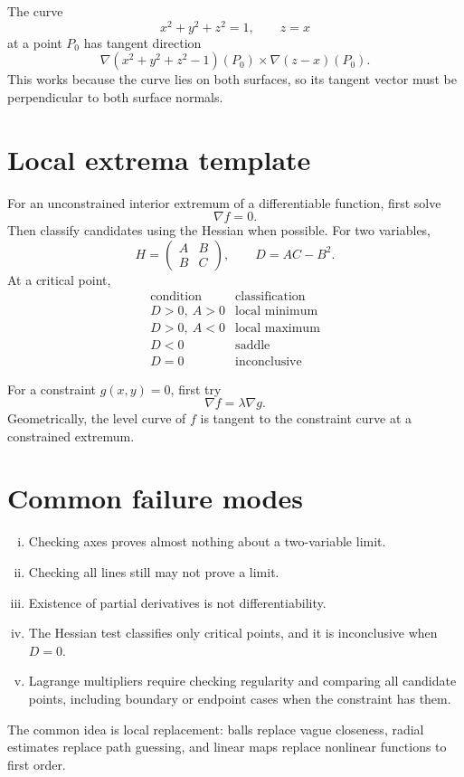 \begin{example}
The curve
\[
  x^2+y^2+z^2=1,\qquad z=x
\]
at a point \(P_0\) has tangent direction
\[
  \nabla(x^2+y^2+z^2-1)(P_0)
  \times
  \nabla(z-x)(P_0).
\]
This works because the curve lies on both surfaces, so its tangent vector must be perpendicular to both surface normals.
\end{example}

\section{Local extrema template}

For an unconstrained interior extremum of a differentiable function, first solve
\[
  \nabla f=0.
\]
Then classify candidates using the Hessian when possible.  For two variables,
\[
  H=\begin{pmatrix}A&B\\B&C\end{pmatrix},
  \qquad D=AC-B^2.
\]
At a critical point,
\[
\begin{array}{c|c}
\text{condition} & \text{classification}\\
\hline
D>0,\ A>0 & \text{local minimum}\\
D>0,\ A<0 & \text{local maximum}\\
D<0 & \text{saddle}\\
D=0 & \text{inconclusive}
\end{array}
\]

For a constraint \(g(x,y)=0\), first try
\[
  \nabla f=\lambda\nabla g.
\]
Geometrically, the level curve of \(f\) is tangent to the constraint curve at a constrained extremum.

\section{Common failure modes}

\begin{enumerate}[(i)]
  \item Checking axes proves almost nothing about a two-variable limit.
  \item Checking all lines still may not prove a limit.
  \item Existence of partial derivatives is not differentiability.
  \item The Hessian test classifies only critical points, and it is inconclusive when \(D=0\).
  \item Lagrange multipliers require checking regularity and comparing all candidate points, including boundary or endpoint cases when the constraint has them.
\end{enumerate}

The common idea is local replacement: balls replace vague closeness, radial estimates replace path guessing, and linear maps replace nonlinear functions to first order.
